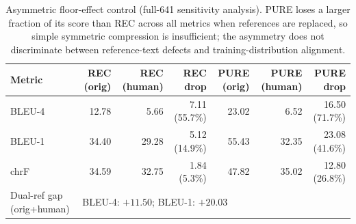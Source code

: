 \documentclass[pdflatex,sn-chicago]{sn-jnl}
\begin{document}
\begin{table}[h]
\centering
\scriptsize
\caption{Asymmetric floor-effect control (full-641 sensitivity analysis). PURE loses a larger fraction of its score than REC across all metrics when references are replaced, so simple symmetric compression is insufficient; the asymmetry does not discriminate between reference-text defects and training-distribution alignment.}
\label{tab:s2_floor_effect}
\begin{tabular}{lrrrrrr}
\toprule
Metric & REC (orig) & REC (human) & REC drop & PURE (orig) & PURE (human) & PURE drop \\
\midrule
BLEU-4 & 12.78 & 5.66 & 7.11 (55.7\%) & 23.02 & 6.52 & 16.50 (71.7\%) \\
BLEU-1 & 34.40 & 29.28 & 5.12 (14.9\%) & 55.43 & 32.35 & 23.08 (41.6\%) \\
chrF   & 34.59 & 32.75 & 1.84 (5.3\%)  & 47.82 & 35.02 & 12.80 (26.8\%) \\
\midrule
Dual-ref gap (orig+human) & \multicolumn{6}{l}{BLEU-4: $+11.50$; BLEU-1: $+20.03$} \\
\bottomrule
\end{tabular}
\end{table}
\end{document}
